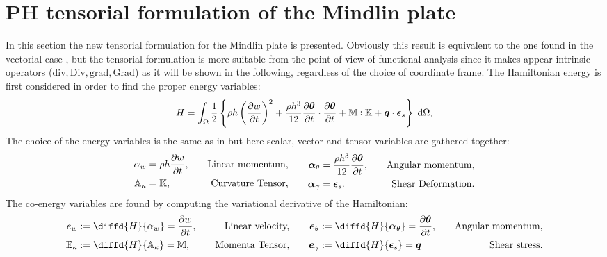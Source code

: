 \documentclass[11pt]{article}
\def\onedot{$\mathsurround0pt\ldotp$}
\def\cddot{%
	\mathbin{\vcenter{\baselineskip.67ex
			\hbox{\onedot}\hbox{\onedot}}%
}}
\begin{document}
	\section{PH tensorial formulation of the Mindlin plate}
	\label{sec:PH_ten_Min}
	In this section the new tensorial formulation for the Mindlin plate is presented. {Obviously this result is equivalent to the one found in the vectorial case \cite{MacchelliMindlin}, but the tensorial formulation is more suitable from the point of view of functional analysis since it makes appear intrinsic operators ($\mathrm{div}, \mathrm{Div}, \mathrm{grad}, \mathrm{Grad}$) as it will be shown in the following, regardless of the choice of coordinate frame. \newline
		The Hamiltonian energy is first considered in order to find the proper energy variables:
		\begin{equation}
		\label{eq:H_min}
		H = \int_{\Omega} \frac{1}{2} \left\{ \rho h \left(\diffp{w}{t} \right)^2 + \frac{\rho h^3}{12} \diffp{\bm{\theta}}{t} \cdot   \diffp{\bm{\theta}}{t} +   \mathbb{M} \cddot \mathbb{K} + \bm{q} \cdot \bm{\epsilon}_s  \right\}  \d\Omega, 
		\end{equation}
		The choice of the energy variables is the same as in \cite{MacchelliMindlin} but here scalar,}  vector and tensor variables are gathered together:
	\begin{equation}
	\begin{aligned}
	\alpha_w &= \rho h \diffp{w}{t}, \quad &\text{Linear momentum,} \\
	\mathbb{A}_{\kappa} &= \mathbb{K}, \quad &\text{Curvature Tensor,} \\
	\end{aligned} \qquad
	\begin{aligned}
	\bm\alpha_{\theta} &=  \frac{\rho h^3}{12} \diffp{\bm{\theta}}{t}, \quad &\text{Angular momentum,}\\
	\bm\alpha_{\gamma} &= \bm{\epsilon}_s. \quad &\text{Shear Deformation.}\\
	\end{aligned}
	\end{equation}
	The co-energy variables are found by computing the variational derivative of the Hamiltonian:
	\begin{equation}
	\begin{aligned}
	e_w &:= \diffd{H}{\alpha_w} = \diffp{w}{t},  \quad &\text{Linear velocity,} \\
	\mathbb{E}_{\kappa} &:= \diffd{H}{\mathbb{A}_{\kappa}} = \mathbb{M}, \quad &\text{Momenta Tensor,}\\
	\end{aligned} \qquad
	\begin{aligned}
	\bm{e}_{\theta} &:= \diffd{H}{\bm\alpha_{\theta}} = \diffp{\bm{\theta}}{t}, \quad &\text{Angular momentum,}  \\
	\bm{e}_{\gamma} &:= \diffd{H}{\bm{\epsilon}_s} = \bm{q} \quad &\text{Shear stress.} \\
	\end{aligned}
	\end{equation}
\end{document}
